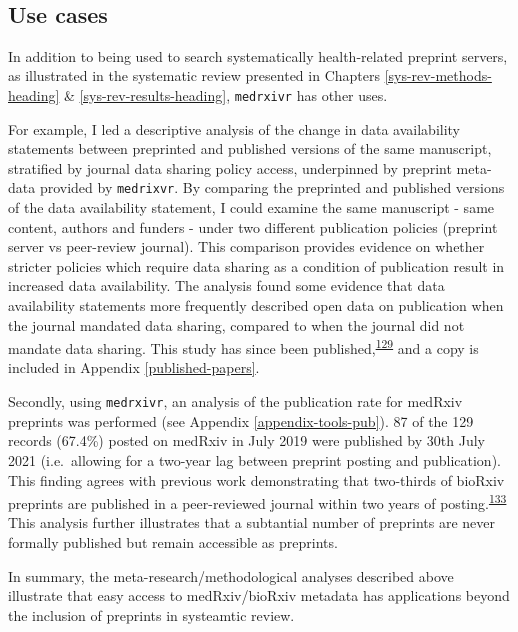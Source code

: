\documentclass[a4paper, twoside]{templates/ociamthesis}
\begin{document}
~

\hypertarget{use-cases}{%
\subsection{Use cases}\label{use-cases}}

In addition to being used to search systematically health-related preprint servers, as illustrated in the systematic review presented in Chapters \ref{sys-rev-methods-heading} \& \ref{sys-rev-results-heading}, \texttt{medrxivr} has other uses.

For example, I led a descriptive analysis of the change in data availability statements between preprinted and published versions of the same manuscript, stratified by journal data sharing policy access, underpinned by preprint meta-data provided by \texttt{medrixvr}. By comparing the preprinted and published versions of the data availability statement, I could examine the same manuscript - same content, authors and funders - under two different publication policies (preprint server vs peer-review journal). This comparison provides evidence on whether stricter policies which require data sharing as a condition of publication result in increased data availability. The analysis found some evidence that data availability statements more frequently described open data on publication when the journal mandated data sharing, compared to when the journal did not mandate data sharing. This study has since been published,\textsuperscript{\protect\hyperlink{ref-mcguinness2020DAScomparison}{129}} and a copy is included in Appendix \ref{published-papers}.

Secondly, using \texttt{medrxivr}, an analysis of the publication rate for medRxiv preprints was performed (see Appendix \ref{appendix-tools-pub}). 87 of the 129 records (67.4\%) posted on medRxiv in July 2019 were published by 30th July 2021 (i.e.~allowing for a two-year lag between preprint posting and publication). This finding agrees with previous work demonstrating that two-thirds of bioRxiv preprints are published in a peer-reviewed journal within two years of posting.\textsuperscript{\protect\hyperlink{ref-abdill2019popularity}{133}} This analysis further illustrates that a subtantial number of preprints are never formally published but remain accessible as preprints.

In summary, the meta-research/methodological analyses described above illustrate that easy access to medRxiv/bioRxiv metadata has applications beyond the inclusion of preprints in systeamtic review.
\end{document}
